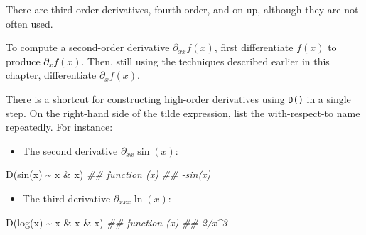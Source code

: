 \documentclass[
  letterpaper,
  DIV=11,
  numbers=noendperiod,
  oneside]{scrreprt}
\newenvironment{Shaded}{\begin{snugshade}}{\end{snugshade}}
\newcommand{\DocumentationTok}[1]{\textcolor[rgb]{0.37,0.37,0.37}{\textit{#1}}}
\newcommand{\FunctionTok}[1]{\textcolor[rgb]{0.28,0.35,0.67}{#1}}
\newcommand{\NormalTok}[1]{\textcolor[rgb]{0.00,0.46,0.62}{#1}}
\newcommand{\SpecialCharTok}[1]{\textcolor[rgb]{0.37,0.37,0.37}{#1}}
\providecommand{\tightlist}{%
  \setlength{\itemsep}{0pt}\setlength{\parskip}{0pt}}
\begin{document}
There are third-order derivatives, fourth-order, and on up, although
they are not often used.

To compute a second-order derivative \(\partial_{xx} f(x)\), first
differentiate \(f(x)\) to produce \(\partial_x f(x)\). Then, still using
the techniques described earlier in this chapter, differentiate
\(\partial_x f(x)\).

There is a shortcut for constructing high-order derivatives using
\texttt{D()} in a single step. On the right-hand side of the tilde
expression, list the with-respect-to name repeatedly. For instance:

\begin{itemize}
\tightlist
\item
  The second derivative \(\partial_{xx} \sin(x)\):
\end{itemize}

\begin{Shaded}
\begin{Highlighting}[]
\FunctionTok{D}\NormalTok{(}\FunctionTok{sin}\NormalTok{(x) }\SpecialCharTok{\textasciitilde{}}\NormalTok{ x }\SpecialCharTok{\&}\NormalTok{ x)}
\DocumentationTok{\#\# function (x) }
\DocumentationTok{\#\# {-}sin(x)}
\end{Highlighting}
\end{Shaded}

\begin{itemize}
\tightlist
\item
  The third derivative \(\partial_{xxx} \ln(x)\):
\end{itemize}

\begin{Shaded}
\begin{Highlighting}[]
\FunctionTok{D}\NormalTok{(}\FunctionTok{log}\NormalTok{(x) }\SpecialCharTok{\textasciitilde{}}\NormalTok{ x }\SpecialCharTok{\&}\NormalTok{ x }\SpecialCharTok{\&}\NormalTok{ x)}
\DocumentationTok{\#\# function (x) }
\DocumentationTok{\#\# 2/x\^{}3}
\end{Highlighting}
\end{Shaded}
\end{document}
